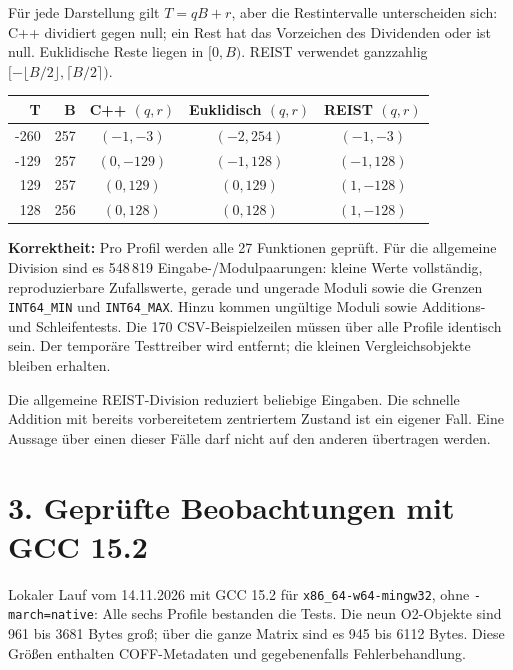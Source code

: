 \documentclass[11pt,a4paper]{article}
\begin{document}
Für jede Darstellung gilt $T=qB+r$, aber die Restintervalle unterscheiden sich:
C++ dividiert gegen null; ein Rest hat das Vorzeichen des Dividenden oder ist
null. Euklidische Reste liegen in $[0,B)$. REIST verwendet ganzzahlig
$[-\lfloor B/2\rfloor,\lceil B/2\rceil)$.

\begin{center}
\begin{tabular}{@{}rrccc@{}}
\toprule
T & B & C++ $(q,r)$ & Euklidisch $(q,r)$ & REIST $(q,r)$ \\
\midrule
-260 & 257 & $(-1,-3)$ & $(-2,254)$ & $(-1,-3)$ \\
-129 & 257 & $(0,-129)$ & $(-1,128)$ & $(-1,128)$ \\
129 & 257 & $(0,129)$ & $(0,129)$ & $(1,-128)$ \\
128 & 256 & $(0,128)$ & $(0,128)$ & $(1,-128)$ \\
\bottomrule
\end{tabular}
\end{center}

\textbf{Korrektheit:} Pro Profil werden alle 27 Funktionen geprüft. Für die
allgemeine Division sind es 548\,819 Eingabe-/Modulpaarungen: kleine Werte
vollständig, reproduzierbare Zufallswerte, gerade und ungerade Moduli sowie
die Grenzen \texttt{INT64\_MIN} und \texttt{INT64\_MAX}. Hinzu kommen ungültige
Moduli sowie Additions- und Schleifentests. Die 170 CSV-Beispielzeilen müssen
über alle Profile identisch sein. Der temporäre Testtreiber wird entfernt;
die kleinen Vergleichsobjekte bleiben erhalten.

Die allgemeine REIST-Division reduziert beliebige Eingaben. Die schnelle
Addition mit bereits vorbereitetem zentriertem Zustand ist ein eigener Fall.
Eine Aussage über einen dieser Fälle darf nicht auf den anderen übertragen werden.

\newpage
\section*{3. Geprüfte Beobachtungen mit GCC 15.2}
Lokaler Lauf vom 14.11.2026 mit GCC 15.2 für
\texttt{x86\_64-w64-mingw32}, ohne \texttt{-march=native}:
Alle sechs Profile bestanden die Tests. Die neun O2-Objekte sind 961 bis
3681 Bytes groß; über die ganze Matrix sind es 945 bis 6112 Bytes.
Diese Größen enthalten COFF-Metadaten und gegebenenfalls Fehlerbehandlung.
\end{document}
